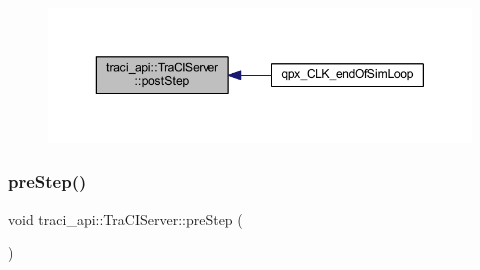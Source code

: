 \begin{figure}[H]
\begin{center}
\leavevmode
\includegraphics[width=350pt]{classtraci__api_1_1_tra_c_i_server_af4814a9a99d79f4e00fc102169d10cc2_icgraph}
\end{center}
\end{figure}
\mbox{\label{classtraci__api_1_1_tra_c_i_server_a8cd79e7da542e4abccc75d4933331d20}} 
\subsubsection{\texorpdfstring{pre\+Step()}{preStep()}}
{\footnotesize\ttfamily void traci\+\_\+api\+::\+Tra\+C\+I\+Server\+::pre\+Step (\begin{DoxyParamCaption}{ }\end{DoxyParamCaption})}

